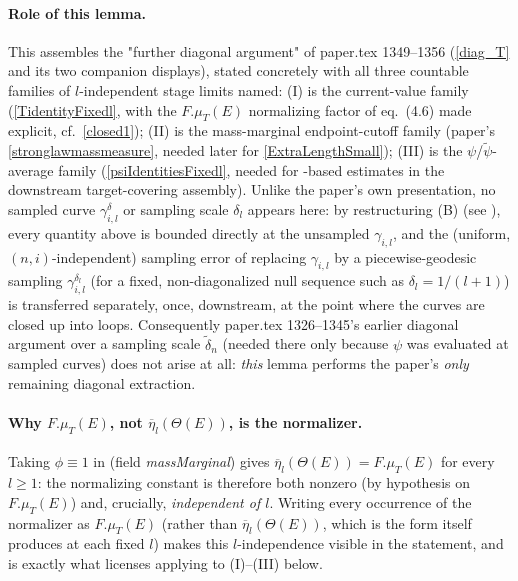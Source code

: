 \begin{lemma}
  \paragraph{Role of this lemma.} This assembles the "further diagonal argument" of paper.tex
  1349--1356 (\eqref{diag_T} and its two companion displays), stated concretely with all three
  countable families of $l$-independent stage limits named: (I) is the current-value family
  (\eqref{TidentityFixedl}, with the $F.\mu_T(E)$ normalizing factor of eq.~(4.6) made explicit,
  cf.\ \eqref{closed1}); (II) is the mass-marginal endpoint-cutoff family (paper's
  \eqref{stronglawmassmeasure}, needed later for \eqref{ExtraLengthSmall}); (III) is the
  $\psi$/$\tilde\psi$-average family (\eqref{psiIdentitiesFixedl}, needed for
  -based estimates in the downstream target-covering assembly). Unlike the paper's own
  presentation, no sampled curve $\gamma^\delta_{i,l}$ or sampling scale $\delta_l$ appears here:
  by restructuring (B) (see ), every quantity above is bounded
  directly at the unsampled $\gamma_{i,l}$, and the (uniform, $(n,i)$-independent) sampling error
  of replacing $\gamma_{i,l}$ by a piecewise-geodesic sampling $\gamma_{i,l}^{\delta_l}$ (for a
  fixed, non-diagonalized null sequence such as $\delta_l = 1/(l+1)$) is transferred separately,
  once, downstream, at the point where the curves are closed up into loops. Consequently
  paper.tex 1326--1345's earlier diagonal argument over
  a sampling scale $\tilde\delta_n$ (needed there only because $\psi$ was evaluated at sampled
  curves) does not arise at all: \emph{this} lemma performs the paper's \emph{only} remaining
  diagonal extraction.

  \paragraph{Why $F.\mu_T(E)$, not $\overline\eta_l(\Theta(E))$, is the normalizer.} Taking
  $\phi \equiv 1$ in  (field \emph{massMarginal}) gives
  $\overline\eta_l(\Theta(E)) = F.\mu_T(E)$ for every $l \ge 1$: the normalizing constant is
  therefore both nonzero (by hypothesis on $F.\mu_T(E)$) and, crucially, \emph{independent of
  $l$}. Writing every occurrence of the normalizer as $F.\mu_T(E)$ (rather than
  $\overline\eta_l(\Theta(E))$, which is the form  itself produces at each
  fixed $l$) makes this $l$-independence visible in the statement, and is exactly what licenses
  applying  to (I)--(III) below.


\end{lemma}
